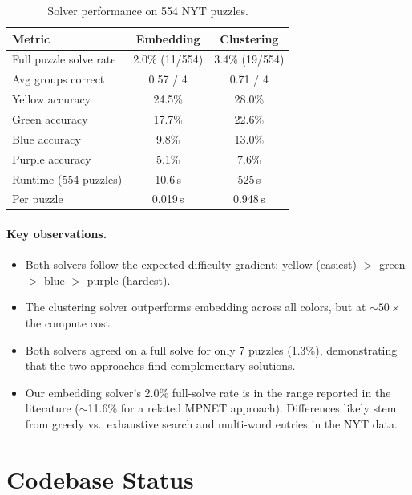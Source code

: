 \documentclass[11pt]{article}
\begin{document}
\begin{table}[h]
\centering
\caption{Solver performance on 554 NYT puzzles.}
\begin{tabular}{@{}lcc@{}}
\toprule
Metric & Embedding & Clustering \\
\midrule
Full puzzle solve rate & 2.0\% (11/554) & 3.4\% (19/554) \\
Avg groups correct     & 0.57 / 4        & 0.71 / 4 \\
\midrule
Yellow accuracy        & 24.5\%          & 28.0\% \\
Green accuracy         & 17.7\%          & 22.6\% \\
Blue accuracy          & 9.8\%           & 13.0\% \\
Purple accuracy        & 5.1\%           & 7.6\% \\
\midrule
Runtime (554 puzzles)  & 10.6\,s         & 525\,s \\
Per puzzle             & 0.019\,s        & 0.948\,s \\
\bottomrule
\end{tabular}
\end{table}

\paragraph{Key observations.}
\begin{itemize}[nosep]
    \item Both solvers follow the expected difficulty gradient: yellow (easiest)
          $>$ green $>$ blue $>$ purple (hardest).
    \item The clustering solver outperforms embedding across all colors, but at
          ${\sim}50\times$ the compute cost.
    \item Both solvers agreed on a full solve for only 7 puzzles (1.3\%),
          demonstrating that the two approaches find complementary solutions.
    \item Our embedding solver's 2.0\% full-solve rate is in the range reported
          in the literature ($\sim$11.6\% for a related MPNET approach).
          Differences likely stem from greedy vs.\ exhaustive search and
          multi-word entries in the NYT data.
\end{itemize}

\section{Codebase Status}
\end{document}
